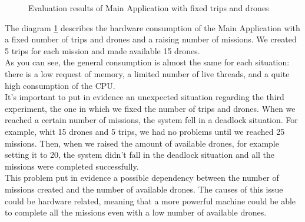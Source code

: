 \begin{figure}[h!]
\centering
  \caption{Evaluation results of Main Application with fixed trips and drones}
  \label{fig:mainApp3}
\end{figure}

The diagram \ref{fig:mainApp3} describes the hardware consumption of the Main Application with a fixed number of trips and drones and a raising number of missions. We created 5 trips for each mission and made available 15 drones.
\\

As you can see, the general consumption is almost the same for each situation: there is a low request of memory, a limited number of live threads, and a quite high consumption of the CPU.
\\

It's important to put in evidence an unexpected situation regarding the third experiment, the one in which we fixed the number of trips and drones.
When we reached a certain number of missions, the system fell in a deadlock situation.
For example, whit 15 drones and 5 trips, we had no problems until we reached 25 missions.
Then, when we raised the amount of available drones, for example setting it to 20, the system didn't fall in the deadlock situation and all the missions were completed successfully.
\\
This problem put in evidence a possible dependency between the number of missions created and the number of available drones.
The causes of this issue could be hardware related, meaning that a more powerful machine could be able to complete all the missions even with a low number of available drones.
